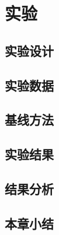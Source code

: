 \chapter{实验}
    \section{实验设计}
    \section{实验数据}
    \section{基线方法}
    \section{实验结果}
    \section{结果分析}
    \section{本章小结}